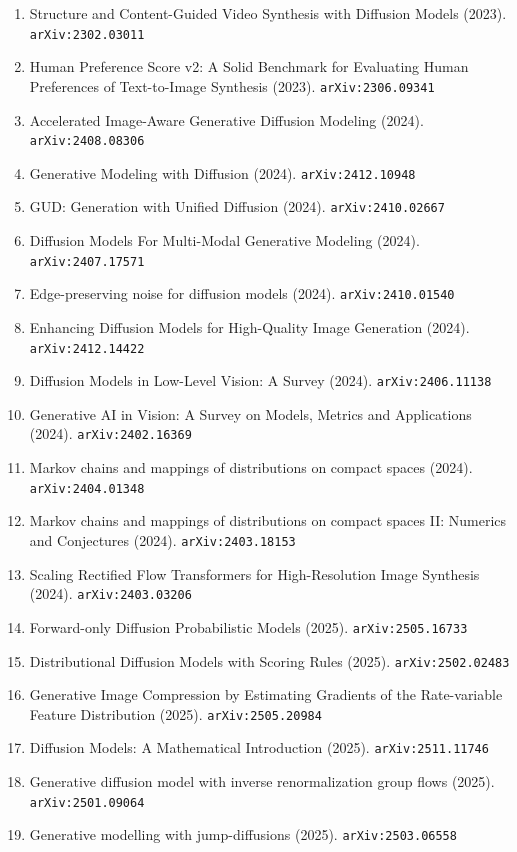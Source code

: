 \documentclass[11pt]{article}
\begin{document}
\begin{enumerate}
  \item Structure and Content-Guided Video Synthesis with Diffusion Models (2023). \texttt{arXiv:2302.03011}
  \item Human Preference Score v2: A Solid Benchmark for Evaluating Human
  Preferences of Text-to-Image Synthesis (2023). \texttt{arXiv:2306.09341}
  \item Accelerated Image-Aware Generative Diffusion Modeling (2024). \texttt{arXiv:2408.08306}
  \item Generative Modeling with Diffusion (2024). \texttt{arXiv:2412.10948}
  \item GUD: Generation with Unified Diffusion (2024). \texttt{arXiv:2410.02667}
  \item Diffusion Models For Multi-Modal Generative Modeling (2024). \texttt{arXiv:2407.17571}
  \item Edge-preserving noise for diffusion models (2024). \texttt{arXiv:2410.01540}
  \item Enhancing Diffusion Models for High-Quality Image Generation (2024). \texttt{arXiv:2412.14422}
  \item Diffusion Models in Low-Level Vision: A Survey (2024). \texttt{arXiv:2406.11138}
  \item Generative AI in Vision: A Survey on Models, Metrics and Applications (2024). \texttt{arXiv:2402.16369}
  \item Markov chains and mappings of distributions on compact spaces (2024). \texttt{arXiv:2404.01348}
  \item Markov chains and mappings of distributions on compact spaces II:
  Numerics and Conjectures (2024). \texttt{arXiv:2403.18153}
  \item Scaling Rectified Flow Transformers for High-Resolution Image Synthesis (2024). \texttt{arXiv:2403.03206}
  \item Forward-only Diffusion Probabilistic Models (2025). \texttt{arXiv:2505.16733}
  \item Distributional Diffusion Models with Scoring Rules (2025). \texttt{arXiv:2502.02483}
  \item Generative Image Compression by Estimating Gradients of the Rate-variable Feature Distribution (2025). \texttt{arXiv:2505.20984}
  \item Diffusion Models: A Mathematical Introduction (2025). \texttt{arXiv:2511.11746}
  \item Generative diffusion model with inverse renormalization group flows (2025). \texttt{arXiv:2501.09064}
  \item Generative modelling with jump-diffusions (2025). \texttt{arXiv:2503.06558}

\end{enumerate}
\end{document}

